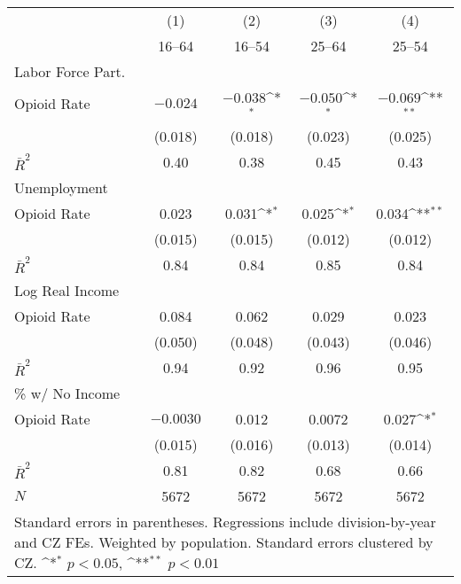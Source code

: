 {
\def\sym#1{\ifmmode^{#1}\else\(^{#1}\)\fi}
\begin{tabular}{l*{4}{c}}
\hline\hline
            &\multicolumn{1}{c}{(1)}&\multicolumn{1}{c}{(2)}&\multicolumn{1}{c}{(3)}&\multicolumn{1}{c}{(4)}\\
            &\multicolumn{1}{c}{16--64}&\multicolumn{1}{c}{16--54}&\multicolumn{1}{c}{25--64}&\multicolumn{1}{c}{25--54}\\
\hline\hline
Labor Force Part.\\
\hline
Opioid Rate &      $-0.024$        &      $-0.038$\sym{*} &      $-0.050$\sym{*} &      $-0.069$\sym{**}\\
            &     (0.018)        &     (0.018)        &     (0.023)        &     (0.025)        \\
\hline
$\bar{R}^2$ &        0.40        &        0.38        &        0.45        &        0.43        \\
\hline\hline
Unemployment \\
\hline
Opioid Rate &       0.023        &       0.031\sym{*} &       0.025\sym{*} &       0.034\sym{**}\\
            &     (0.015)        &     (0.015)        &     (0.012)        &     (0.012)        \\
\hline
$\bar{R}^2$ &        0.84        &        0.84        &        0.85        &        0.84        \\
\hline\hline
Log Real Income \\
\hline
Opioid Rate &       0.084        &       0.062        &       0.029        &       0.023        \\
            &     (0.050)        &     (0.048)        &     (0.043)        &     (0.046)        \\
\hline
$\bar{R}^2$ &        0.94        &        0.92        &        0.96        &        0.95        \\
\hline\hline
\% w/ No Income \\
\hline
Opioid Rate &     $-0.0030$        &       0.012        &      0.0072        &       0.027\sym{*} \\
            &     (0.015)        &     (0.016)        &     (0.013)        &     (0.014)        \\
\hline
$\bar{R}^2$ &        0.81        &        0.82        &        0.68        &        0.66        \\
$N$         &        5672        &        5672        &        5672        &        5672        \\
\hline\hline
\multicolumn{5}{p{0.55\linewidth}}{\footnotesize Standard errors in parentheses.  Regressions include division-by-year and CZ FEs.  Weighted by population.  Standard errors clustered by CZ.  \sym{*} \(p<0.05\), \sym{**} \(p<0.01\)}\\
\end{tabular}
}
